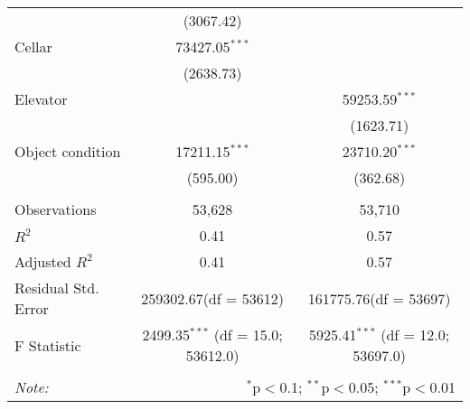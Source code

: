 \begin{table}[!htbp]
\begin{tabular}{@{\extracolsep{5pt}}lcc}
  & (3067.42) & \\
 Cellar & 73427.05$^{***}$ & \\
  & (2638.73) & \\
 Elevator & & 59253.59$^{***}$ \\
  & & (1623.71) \\
 Object condition & 17211.15$^{***}$ & 23710.20$^{***}$ \\
  & (595.00) & (362.68) \\
\hline \\[-1.8ex]
 Observations & 53,628 & 53,710 \\
 $R^2$ & 0.41 & 0.57 \\
 Adjusted $R^2$ & 0.41 & 0.57 \\
 Residual Std. Error & 259302.67(df = 53612) & 161775.76(df = 53697)  \\
 F Statistic & 2499.35$^{***}$ (df = 15.0; 53612.0) & 5925.41$^{***}$ (df = 12.0; 53697.0) \\
\hline
\hline \\[-1.8ex]
\textit{Note:} & \multicolumn{2}{r}{$^{*}$p$<$0.1; $^{**}$p$<$0.05; $^{***}$p$<$0.01} \\
\end{tabular}
\end{table}